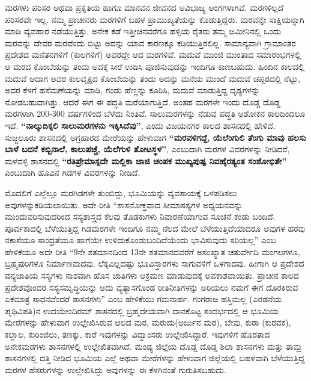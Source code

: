 ಮರಗಳು ಪರಿಸರ ಅಥವಾ ಪ್ರಕೃತಿಯ ಹಾಗೂ ಮಾನವನ ಜೀವನದ ಅವಿಭಾಜ್ಯ ಅಂಗಗಳಾಗಿವೆ. ಮರಗಳಿಲ್ಲದೆ ಪರಿಸರವೇ ಇಲ್ಲ. ನಮ್ಮ ಪ್ರಾಚೀನರು ಮರಗಳಿಗೆ ಬಹಳ ಪ್ರಾಮುಖ್ಯತೆಯನ್ನು ಕೊಡುತ್ತಿದ್ದರು. ಮರವನ್ನೇ ಸಾಕ್ಷಿಯನ್ನಾಗಿ ಮಾಡಿ ವ್ಯವಹಾರ ನಡೆಯುತ್ತಿತ್ತು. ಅನೇಕ ಕಡೆ ಇತ್ತೀಚಿನವರೆಗೂ ಹಳ್ಳಿಯ ರೈತರು ತಮ್ಮ ಜಮೀನಿನಲ್ಲಿ ಒಂದು ಮರವನ್ನು ದೇವರ ಮರವೆಂದು ಬಿಟ್ಟು ಅದನ್ನು ಯಾವ ಕಾರಣಕ್ಕೂ ಕಡಿಯುತ್ತಿರಲಿಲ್ಲ. ಸಾಮಾನ್ಯವಾಗಿ ಗ್ರಾಮಾಂತರ ಪ್ರದೇಶದ ಮನೆತನಗಳಿಗೆ (ಕುಲಗಳಿಗೆ) ಅವರದ್ದೇ ಆದ ಮರಗಳಿವೆ. ಮದುವೆ ಮುಂಜಿ ಮುಂತಾದ ಸಮಾರಂಭಗಳಲ್ಲಿ ಆ ಮರದ ಕೊಂಬೆಯನ್ನು ತಂದು ಅದಕ್ಕೆ ಸೀರೆ ಉಡಿಸಿ ಪೂಜಿಸುವುದನ್ನು ಇಂದಿಗೂ ಕಾಣಬಹುದು. ಹಿಂದಿನ ಕಾಲದಲ್ಲಿ ಮದುವೆ ಆದಾಗ ಅವರ ಕುಲವೃಕ್ಷದ ಕೊಂಬೆಯನ್ನು ತಂದು ಅದನ್ನು ಮನೆಯ ಮುಂದೆ ಮದುವೆ ಚಪ್ಪರದಲ್ಲಿ ನೆಟ್ಟು, ಅದರ ಕೆಳಗೆ ಹಸೆಮಣೆಯನ್ನು ಮಾಡಿ, ಗಂಡು ಹೆಣ್ಣನ್ನು ಕೂರಿಸಿ, ಮದುವೆ ಮಾಡುತ್ತಿದ್ದ ದೃಶ್ಯಗಳನ್ನು ನೋಡಬಹುದಾಗಿತ್ತು. ಆದರೆ ಈಗ ಈ ಪದ್ಧತಿ ಮರೆಯಾಗುತ್ತಿದೆ. ಅಂತಹ ಮರಗಳೇ ಇಂದು ದೊಡ್ಡ ದೊಡ್ಡ ಮರಗಳಾಗಿ 200-300 ವರ್ಷಗಳಿಂದ ಬೆಳೆದು ನಿಂತಿವೆ. ಸಾಲುಮರಗಳನ್ನು ನೆಡುವ ಪದ್ಧತಿ ಅಶೋಕನ ಕಾಲದಿಂದಲೂ ಇದೆ. \textbf{“ನಾಲ್ಕುದಿಕ್ಕಲಿ ಸಾಲುಮರಗಳನು ಇಕ್ಕಿಸಿದೆವು”}, ಎಂದು ವಿಜಯನಗರ ಕಾಲದ ಶಾಸನದಲ್ಲಿ ಹೇಳಿದೆ. ಸುಜ್ಜಲೂರು ಶಾಸನದಲ್ಲಿ ಅಗ್ರಹಾರದ ಮೇರೆಯನ್ನು ಹೇಳುವಾಗ \textbf{“ಮರವಳಿಗದ್ದೆ, ಯೆಲೆಂಗುಲಿ ತೆಂಗು ಮಾವು\general{\break } ಹಲಸು ಬಾಳೆ ಬದನೆ ಕಬ್ಬಿನಾಲೆ, ಕಾಲುಪಚ್ಚೆ, ಯೆಲೆಗುಳಿ ತೋಟಸ್ಥಳ”}, ಎಂಬುದಾಗಿ ಮರಗಳ ವಿವರಗಳನ್ನು ನೀಡಿದರೆ, ಮಳವಳ್ಳಿ ಶಾಸನದಲ್ಲಿ \textbf{“ರತಿಪ್ರೇಮಾಸ್ಪದೇ ಮಲ್ಲಿಕಾ ಜಾಜಿ ಚಂಪಕ ಮುಖ್ಯಪುಷ್ಪ ನಿವಹೈರತ್ಯಂತ ಸಂಶೋಭಿತೇ”} ಎಂಬುದಾಗಿ ಹೂವಿನ ಗಿಡಗಳ ವಿವರಗಳನ್ನು ನೀಡಿದೆ.

ಮೊದಲಿಗೆ ಎಲ್ಲೆಲ್ಲೂ ಮರಗಿಡಗಳೇ ತುಂಬಿದ್ದು, ಭೂಮಿಯನ್ನು ವ್ಯವಸಾಯಕ್ಕೆ ಒಳಪಡಿಸಲು ಅವುಗಳನ್ನು\break ಕಡಿಯಲಾಯಿತು. ಅದೇ ರೀತಿ “ಶಾಸನೋಕ್ತವಾದ ಸೀಮಾಸಸ್ಯಗಳ ಅಧ್ಯಯನವನ್ನು ಮುಂದುವರಿಸುವುದರಿಂದ ಸಸ್ಯಶಾಸ್ತ್ರದ ಕೆಲವು ತೊಡಕುಗಳು ನಿವಾರಣೆಯಾಗುವ ಸೂಚನೆ ಕಂಡು ಬಂದಿದೆ. ಪೂರ್ವಕಾದಲ್ಲಿ ಬೆಳೆಯುತ್ತಿದ್ದ ಗಿಡಮರಗಳೇ ಇಂದಿಗೂ ನಮ್ಮ ನೆಲದ ಮೇಲೆ ಬೆಳೆಯುತ್ತಿವೆಯಾದರೂ ಅವುಗಳ ಹರವು ನಕಾಸೆಯೂ ಸಾಂಧ್ರತೆಯೂ ಹಾಗೆಯೇ ಉಳಿದುಕೊಂಡು\break ಬಂದಿದೆಯೆಂದು ಭಾವಿಸುವುದು ಸರಿಯಲ್ಲ” ಎಂಬ ಹೇಳಿಕೆಯೂ ಅದೇ ರೀತಿ “9ನೇ ಶತಮಾನದಿಂದ 13ನೇ ಶತಮಾನದವರೆಗೆ ಅಸಂಖ್ಯಾತ ಚತುರ್ವೇದಿ ಮಂಗಲಗಳೂ, ಬ್ರಹ್ಮಪುರಿಗಳೂ ನಿರ್ಮಾಣವಾದವು. ಲೆಕ್ಕವಿಲ್ಲದಷ್ಟು ಭೂವಿಸ್ತಾರಗಳು ಸಾಗುವಳಿಗೆ ಒಳಗಾದವು. ಹೀಗಾಗಿ ಆ ಪ್ರದೇಶದ ವನ್ಯಜಾತಿಯ ಸಸ್ಯಗಳು ನಾಶವಾಗಿ ಹೊಸ ಜಾತಿಗಳು ಆಕ್ರಮಣ ಮಾಡುವುದಕ್ಕೆ ಅವಕಾಶವಾಯಿತು. ಪ್ರಾಚೀನ ಕಾಲದ ಪ್ರದೇಶವೊಂದರ ಸಸ್ಯಸಮೃದ್ಧಿಯನ್ನು ಅದು ವ್ಯತ್ಯಾಸಗೊಂಡ ರೀತಿನೀತಿಗಳನ್ನು ಅರಿ\-ಯಲು ನಮಗೆ ಈಗ ದೊರಕಿರುವ ಏಕಮಾತ್ರ ಸಾಧನವೆಂದರೆ ಶಾಸನಗಳು” ಎಂಬ ಹೇಳಿಕೆಯು ಗಮನಾರ್ಹ. ಗಂಗರಾಜ ಹಸ್ತಿಮಲ್ಲ (ಎರಡನೆಯ ಪೃಥಿವಿಪತಿ)ನ ಉದಯೇಂದಿರಮ್ ಶಾಸನದಲ್ಲಿ ಬ್ರಹ್ಮದೇಯವಾಗಿ ದಾನಕೊಟ್ಟ ಸಂದರ್ಭದಲ್ಲಿ ಆ ಭೂಮಿಯ ಮೇರೆಗಳನ್ನು ಹೇಳುವಾಗ ಉಲ್ಲೇಖಿಸಿರುವ ಆಲದ ಮರ, ಮರುದು(ಅರ್ಜುನ ಮರ), ಬೇವು, ಕುರಾ (ಕುರವಕ), ಕಲ್ಲಾಲ, ಕುರಿಂಜಿಲು, ತಣಕ್ಕು, ಕಾರೆ ಇವುಗಳನ್ನು ವಿದ್ವಾಂಸರು ಉಲ್ಲೇಖಿಸಿದ್ದಾರೆ. ಇವುಗಳಿಗೆ ಹೊರತಾದ ಅನೇಕ\break ಮರಗಳು ಶಾಸನಗಳಲ್ಲಿ ಉಲ್ಲೇಖಿತವಾಗಿದೆ. ಮಂಡ್ಯ ಜಿಲ್ಲೆಯ ದೊಡ್ಡ ದೊಡ್ಡ ಶಿಲಾ ಶಾಸನಗಳು ಮತ್ತು ತಾಮ್ರ ಶಾಸನಗಳಲ್ಲಿ ದತ್ತಿ ನೀಡಿದ ಭೂಮಿಯ ಎಲ್ಲೆ ಅಥವಾ ಮೇರೆಗಳನ್ನು ಹೇಳುವಾಗ ಜಿಲ್ಲೆಯಲ್ಲಿ ಬಹಳವಾಗಿ ಬೆಳೆಯುತ್ತಿದ್ದ ಮರಗಳ ಹೆಸರುಗಳನ್ನು ಉಲ್ಲೇಖಿಸಿದ್ದು ಅವುಗಳನ್ನು ಈ ಕೆಳಗಿನಂತೆ ಗುರುತಿಸಬಹುದು.

